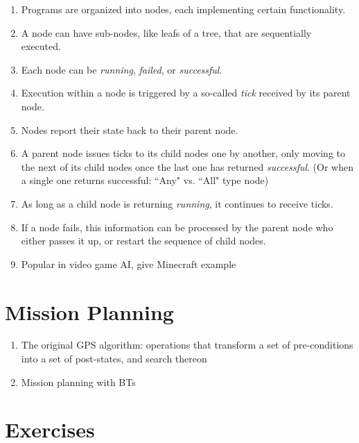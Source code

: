 \begin{enumerate}
\item Programs are organized into nodes, each implementing certain functionality.
\item A node can have sub-nodes, like leafs of a tree, that are sequentially executed.
\item Each node can be \emph{running}, \emph{failed}, or \emph{successful}.
\item Execution within a node is triggered by a so-called \emph{tick} received by its parent node.
\item Nodes report their state back to their parent node.
\item A parent node issues ticks to its child nodes one by another, only moving to the next of its child nodes once the last one has returned \emph{successful}. (Or when a single one returns successful: ``Any" vs. ``All" type node)
\item As long as a child node is returning \emph{running}, it continues to receive ticks.
\item If a node fails, this information can be processed by the parent node who either passes it up, or restart the sequence of child nodes.
\item Popular in video game AI, give Minecraft example
\end{enumerate}

\section{Mission Planning}\label{sec:strips}
\begin{enumerate}
\item The original GPS algorithm: operations that transform a set of pre-conditions into a set of post-states, and search thereon
\item Mission planning with BTs
\end{enumerate}

\section{Exercises}

